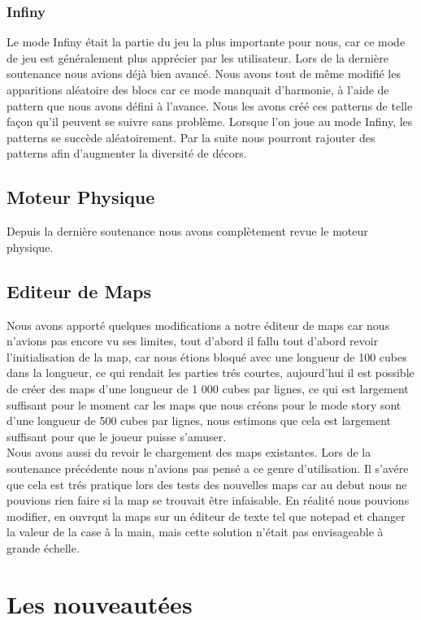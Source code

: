 \documentclass [11pt]{report}
\begin{document}
		\subsection{Infiny}
			Le mode Infiny \'etait la partie du jeu la plus importante pour nous, car ce mode de jeu est g\'en\'eralement plus appr\'ecier par les utilisateur. Lors de la derni\`ere soutenance nous avions d\'ej\`a bien avanc\'e. Nous avons tout de m\^eme modifi\'e les apparitions al\'eatoire des blocs car ce mode manquait d'harmonie, \`a l'aide de pattern que nous avons d\'efini \`a l'avance. Nous les avons cr\'e\'e ces patterns de telle façon qu'il peuvent se suivre sans probl\`eme. Lorsque l'on joue au mode Infiny, les patterns se succ\`ede al\'eatoirement. Par la suite nous pourront rajouter des patterns afin d'augmenter la diversit\'e de d\'ecors.
\newpage
	\section{Moteur Physique}
		Depuis la derni\`ere soutenance nous avons compl\`etement revue le moteur physique.
	\section{Editeur de Maps}
		Nous avons apport\'e quelques modifications a notre \'editeur de maps car nous n'avions pas encore vu ses limites, tout d'abord il fallu tout d'abord revoir l'initialisation de la map, car nous \'etions bloqu\'e avec une longueur de 100 cubes dans la longueur, ce qui rendait les parties tr\'es courtes, aujourd'hui il est possible de cr\'eer des maps d'une longueur de 1 000 cubes par lignes, ce qui est largement suffisant pour le moment car les maps que nous cr\'eons pour le mode story sont d'une longueur de 500 cubes par lignes, nous estimons que cela est largement suffisant pour que le joueur puisse s'amuser.\\
		\indent Nous avons aussi du revoir le chargement des maps existantes. Lors de la soutenance pr\'ec\'edente nous n'avions pas pens\'e a ce genre d'utilisation. Il s'av\'ere que cela est tr\'es pratique lors des tests des nouvelles maps car au debut nous ne pouvions rien faire si la map se trouvait \^etre infaisable. En r\'ealit\'e nous pouvions modifier, en ouvrqnt la maps sur un \'editeur de texte tel que notepad et changer la valeur de la case \`a la main, mais cette solution n'\'etait pas envisageable \`a grande \'echelle.
\chapter{Les nouveaut\'ees}
\end{document}

